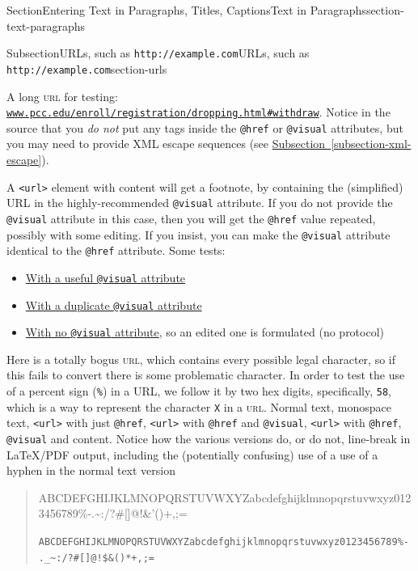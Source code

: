 \documentclass[twoside,10pt,]{article}
\newcommand{\xreffont}{\relax}
\newcommand{\mono}[1]{\texttt{#1}}
\newcommand{\initialism}[1]{\textsc{\MakeLowercase{#1}}}
\numberwithin{equation}{section}
\begin{document}
\begin{sectionptx}{Section}{Entering Text in Paragraphs, Titles, Captions}{}{Text in Paragraphs}{}{}{section-text-paragraphs}
\begin{subsectionptx}{Subsection}{URLs, such as \mono{http://example.com}}{}{URLs, such as \mono{http://example.com}}{}{}{section-urls}
\par
A long \initialism{URL} for testing:  \href{http://www.pcc.edu/enroll/registration/dropping.html\#withdraw}{\nolinkurl{www.pcc.edu/enroll/registration/dropping.html\#withdraw}}.  Notice in the source that you \emph{do not} put any tags inside the \mono{@href} or \mono{@visual} attributes, but you may need to provide XML escape sequences (see \hyperref[subsection-xml-escape]{Subsection~{\xreffont\ref{subsection-xml-escape}}}).%
\par
A \mono{<url>} element with content will get a footnote, by containing the (simplified) URL in the highly-recommended \mono{@visual} attribute.  If you do not provide the \mono{@visual} attribute in this case, then you will get the \mono{@href} value repeated, possibly with some editing.  If you insist, you can make the \mono{@visual} attribute identical to the \mono{@href} attribute.  Some tests:%
\begin{itemize}[label=\textbullet]
\item{}\href{http://example.com/}{With a useful \mono{@visual} attribute}%
\item{}\href{http://example.com/}{With a duplicate \mono{@visual} attribute}%
\item{}\href{http://example.com/}{With no \mono{@visual} attribute}, so an edited one is formulated (no protocol)%
\end{itemize}
%
\par
Here is a totally bogus \initialism{URL}, which contains every possible legal character, so if this fails to convert there is some problematic character.  In order to test the use of a percent sign (\mono{\%}) in a URL, we follow it by two hex digits, specifically, \mono{58}, which is a way to represent the character \mono{X} in a \initialism{URL}.  Normal text, monospace text, \mono{<url>} with just \mono{@href}, \mono{<url>} with \mono{@href} and \mono{@visual}, \mono{<url>} with \mono{@href}, \mono{@visual} and content.  Notice how the various versions do, or do not, line-break in \LaTeX{}\slash{}PDF output, including the (potentially confusing) use of a use of a hyphen in the normal text version%
\begin{quote}%
ABCDEFGHIJKLMNOPQRSTUVWXYZabcdefghijklmnopqrstuvwxyz0123456789\%-.\textunderscore{}\textasciitilde{}:\slash{}?\#[]@!\textdollar{}\&'()\textasteriskcentered{}+,;=%
\par
\mono{ABCDEFGHIJKLMNOPQRSTUVWXYZabcdefghijklmnopqrstuvwxyz0123456789\%-.\_\textasciitilde{}:/?\#[]@!\$\&\textquotesingle{}()*+,;=}%
\par

\end{quote}
\end{subsectionptx}
\end{sectionptx}
\end{document}
